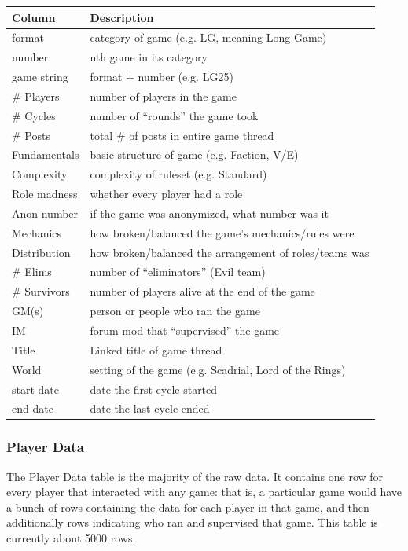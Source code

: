 \documentclass[11pt, oneside]{amsart}   	%
\begin{document}
\begin{table}[h]
    \begin{tabular}{ll}
    \textbf{Column}       & \textbf{Description} \\
    \hline 
    format       & category of game (e.g. LG, meaning Long Game)\\
    number       & nth game in its category   \\
    game string  & format + number (e.g. LG25)   \\
    \# Players   & number of players in the game         \\
    \# Cycles    & number of ``rounds'' the game took        \\
    \# Posts     & total \# of posts in entire game thread          \\
    Fundamentals & basic structure of game (e.g. Faction, V/E)    \\
    Complexity   & complexity of ruleset (e.g. Standard)          \\
    Role madness & whether every player had a role                        \\
    Anon number  & if the game was anonymized, what number was it         \\
    Mechanics    & how broken/balanced the game's mechanics/rules were \\
    Distribution & how broken/balanced the arrangement of roles/teams was \\
    \# Elims     & number of ``eliminators'' (Evil team)                    \\
    \# Survivors & number of players alive at the end of the game         \\
    GM(s)        & person or people who ran the game                      \\
    IM           & forum mod that ``supervised'' the game                   \\
    Title   & Linked title of game thread                            \\
    World        & setting of the game  (e.g. Scadrial, Lord of the Rings)       \\
    start date   & date the first cycle started                           \\
    end date     & date the last cycle ended                                           
    \end{tabular}
    \end{table}


\subsubsection{Player Data}
The Player Data table is the majority of the raw data. It contains one row for every player that interacted with any game: that is, a particular game would have a bunch of rows containing the data for each player in that game, and then additionally rows indicating who ran and supervised that game. This table is currently about 5000 rows. 
\end{document}
